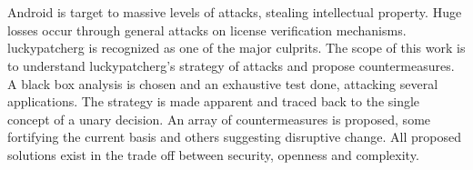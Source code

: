 \chapter{\abstractname}
Android is target to massive levels of attacks, stealing intellectual property.
Huge losses occur through general attacks on license verification mechanisms.
\gls{luckypatcherg} is recognized as one of the major culprits.
The scope of this work is to understand \gls{luckypatcherg}’s strategy of attacks and propose countermeasures.
A black box analysis is chosen and an exhaustive test done, attacking several applications.
The strategy is made apparent and traced back to the single concept of a unary decision.
An array of countermeasures is proposed, some fortifying the current basis and others suggesting disruptive change.
All proposed solutions exist in the trade off between security, openness and complexity.
